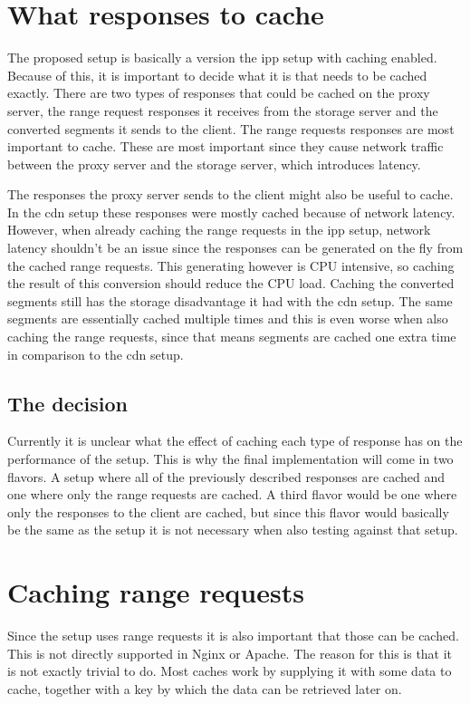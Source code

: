 \documentclass[twoside,openright]{uva-bachelor-thesis}
\begin{document}
\section{What responses to cache}
The proposed setup is basically a version the \gls{ipp} setup with
caching enabled. Because of this, it is important to decide what it is that
needs to be cached exactly. There are two types of responses that could be
cached on the proxy server, the range request responses it receives from the
storage server and the converted segments it sends to the client. The
range requests responses are most important to cache. These are most important
since they cause network traffic between the proxy server and the storage
server, which introduces latency.

The responses the proxy server sends to the client might also be useful to
cache. In the \gls{cdn} setup these responses were mostly cached because of
network latency. However, when already caching the range requests in the
\gls{ipp} setup, network latency shouldn't be an issue since the responses can
be generated on the fly from the cached range requests. This generating however
is CPU intensive, so caching the result of this conversion should reduce the CPU
load. Caching the converted segments still has the storage disadvantage it had
with the \gls{cdn} setup. The same segments are essentially cached multiple
times and this is even worse when also caching the range requests, since that
means segments are cached one extra time in comparison to the \gls{cdn} setup.


\subsection{The decision}
Currently it is unclear what the effect of caching each type of response has on
the performance of the setup. This is why the final implementation will come in two
flavors. A setup where all of the previously described responses are cached and
one where only the range requests are cached. A third flavor would be one where
only the responses to the client are cached, but since this flavor would
basically be the same as the \cdn setup it is not necessary when also testing
against that setup.




\section{Caching range requests}\label{sec:cachingrange}
Since the \ipp setup uses range requests it is also important that those
can be cached. This is not directly supported in Nginx or Apache. The reason for
this is that it is not exactly trivial to do. Most caches work by supplying it
with some data to cache, together with a key by which the data can be retrieved later
on.
\end{document}
